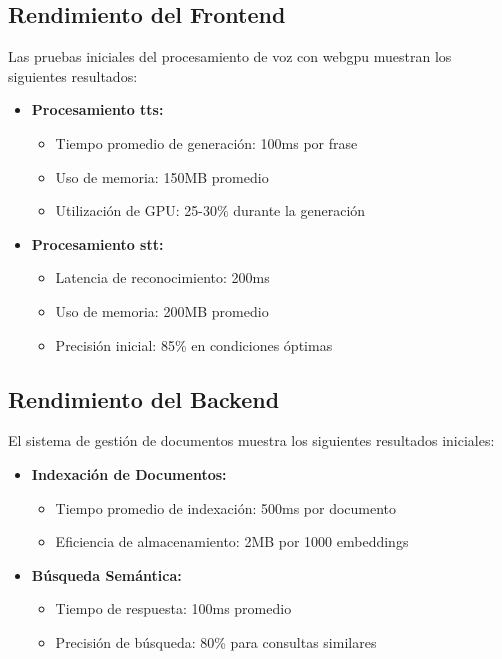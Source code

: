 \subsection{Rendimiento del Frontend}
\label{rendimiento-frontend}

Las pruebas iniciales del procesamiento de voz con \gls{webgpu} muestran los siguientes resultados:

\begin{itemize}
    \item \textbf{Procesamiento \gls{tts}:}
    \begin{itemize}
        \item Tiempo promedio de generación: 100ms por frase
        \item Uso de memoria: 150MB promedio
        \item Utilización de GPU: 25-30\% durante la generación
    \end{itemize}

    \item \textbf{Procesamiento \gls{stt}:}
    \begin{itemize}
        \item Latencia de reconocimiento: 200ms
        \item Uso de memoria: 200MB promedio
        \item Precisión inicial: 85\% en condiciones óptimas
    \end{itemize}
\end{itemize}

\subsection{Rendimiento del Backend}
\label{rendimiento-backend}

El sistema de gestión de documentos muestra los siguientes resultados iniciales:

\begin{itemize}
    \item \textbf{Indexación de Documentos:}
    \begin{itemize}
        \item Tiempo promedio de indexación: 500ms por documento
        \item Eficiencia de almacenamiento: 2MB por 1000 embeddings
    \end{itemize}

    \item \textbf{Búsqueda Semántica:}
    \begin{itemize}
        \item Tiempo de respuesta: 100ms promedio
        \item Precisión de búsqueda: 80\% para consultas similares
    \end{itemize}
\end{itemize}

